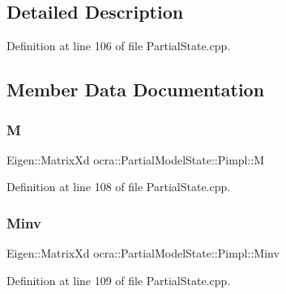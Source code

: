 \subsection{Detailed Description}


Definition at line 106 of file Partial\+State.\+cpp.



\subsection{Member Data Documentation}
\hypertarget{structocra_1_1PartialModelState_1_1Pimpl_aac1b2af908cd347c7c295d0461f605b7}{}\label{structocra_1_1PartialModelState_1_1Pimpl_aac1b2af908cd347c7c295d0461f605b7} 
\subsubsection{\texorpdfstring{M}{M}}
{\footnotesize\ttfamily Eigen\+::\+Matrix\+Xd ocra\+::\+Partial\+Model\+State\+::\+Pimpl\+::M}



Definition at line 108 of file Partial\+State.\+cpp.

\hypertarget{structocra_1_1PartialModelState_1_1Pimpl_a8fc2e9335c4fc0ff753fdb9850ad7bd5}{}\label{structocra_1_1PartialModelState_1_1Pimpl_a8fc2e9335c4fc0ff753fdb9850ad7bd5} 
\subsubsection{\texorpdfstring{Minv}{Minv}}
{\footnotesize\ttfamily Eigen\+::\+Matrix\+Xd ocra\+::\+Partial\+Model\+State\+::\+Pimpl\+::\+Minv}



Definition at line 109 of file Partial\+State.\+cpp.

\hypertarget{structocra_1_1PartialModelState_1_1Pimpl_a1533bd101072998a086254a0bdd9b9e9}{}\label{structocra_1_1PartialModelState_1_1Pimpl_a1533bd101072998a086254a0bdd9b9e9} 
